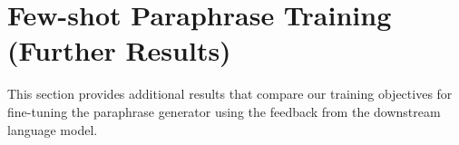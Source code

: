 \documentclass[11pt]{article}
\begin{document}

\appendix

\section{Few-shot Paraphrase Training (Further Results)}
\label{training-paraphrase-extra:appendix}


This section provides additional results that compare our training objectives for fine-tuning the paraphrase generator using the feedback from the downstream language model.
\end{document}
